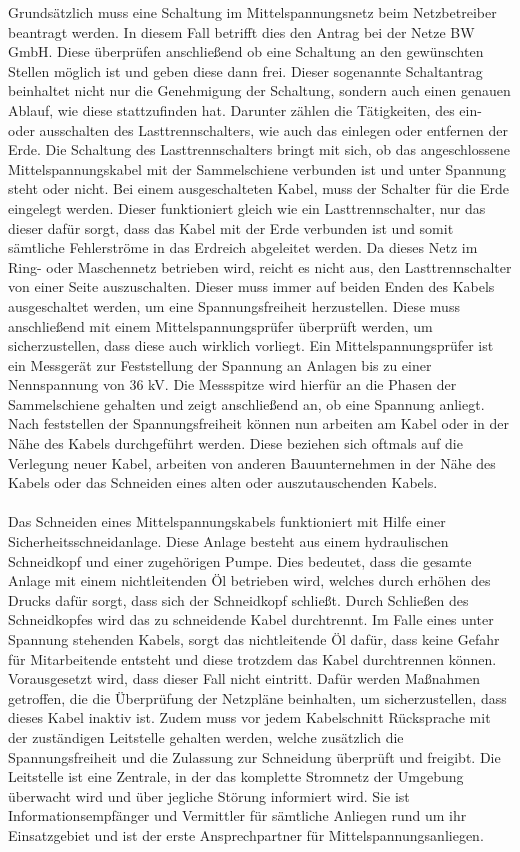 Grundsätzlich muss eine Schaltung im Mittelspannungsnetz beim Netzbetreiber beantragt werden. In diesem Fall betrifft dies den Antrag bei der Netze BW GmbH.
Diese überprüfen anschließend ob eine Schaltung an den gewünschten Stellen möglich ist und geben diese dann frei. Dieser sogenannte Schaltantrag beinhaltet
nicht nur die Genehmigung der Schaltung, sondern auch einen genauen Ablauf, wie diese stattzufinden hat. Darunter zählen die Tätigkeiten, des ein- oder 
ausschalten des Lasttrennschalters, wie auch das einlegen oder entfernen der Erde. Die Schaltung des Lasttrennschalters bringt mit sich, ob das 
angeschlossene Mittelspannungskabel mit der Sammelschiene verbunden ist und unter Spannung steht oder nicht. Bei einem ausgeschalteten Kabel, muss der
Schalter für die Erde eingelegt werden. Dieser funktioniert gleich wie ein Lasttrennschalter, nur das dieser dafür sorgt, dass das Kabel mit der Erde
verbunden ist und somit sämtliche Fehlerströme in das Erdreich abgeleitet werden. Da dieses Netz im Ring- oder Maschennetz betrieben wird, reicht es 
nicht aus, den Lasttrennschalter von einer Seite auszuschalten. Dieser muss immer auf beiden Enden des Kabels ausgeschaltet werden, um eine 
Spannungsfreiheit herzustellen. Diese muss anschließend mit einem Mittelspannungsprüfer überprüft werden, um sicherzustellen, dass diese auch wirklich 
vorliegt. Ein Mittelspannungsprüfer ist ein Messgerät zur Feststellung der Spannung an Anlagen bis zu einer Nennspannung von 36 kV. Die Messspitze wird 
hierfür an die Phasen der Sammelschiene gehalten und zeigt anschließend an, ob eine Spannung anliegt. %
Nach feststellen der 
Spannungsfreiheit können nun arbeiten am Kabel oder in der Nähe des Kabels durchgeführt werden. Diese beziehen sich oftmals auf die Verlegung neuer
Kabel, arbeiten von anderen Bauunternehmen in der Nähe des Kabels oder das Schneiden eines alten oder auszutauschenden Kabels.\\\\
Das Schneiden eines Mittelspannungskabels funktioniert mit Hilfe einer Sicherheitsschneidanlage. Diese Anlage besteht aus einem hydraulischen Schneidkopf
und einer zugehörigen Pumpe. Dies bedeutet, dass die gesamte Anlage mit einem nichtleitenden Öl betrieben wird, welches durch erhöhen des Drucks dafür 
sorgt, dass sich der Schneidkopf schließt. Durch Schließen des Schneidkopfes wird das zu schneidende Kabel durchtrennt. %
Im Falle 
eines unter Spannung stehenden Kabels, sorgt das nichtleitende Öl dafür, dass keine Gefahr für Mitarbeitende entsteht und diese trotzdem das Kabel 
durchtrennen können. Vorausgesetzt wird, dass dieser Fall nicht eintritt. Dafür werden Maßnahmen getroffen, die die Überprüfung der Netzpläne beinhalten,
um sicherzustellen, dass dieses Kabel inaktiv ist. Zudem muss vor jedem Kabelschnitt Rücksprache mit der zuständigen Leitstelle gehalten werden, welche 
zusätzlich die Spannungsfreiheit und die Zulassung zur Schneidung überprüft und freigibt. Die Leitstelle ist eine Zentrale, in der das komplette Stromnetz
der Umgebung überwacht wird und über jegliche Störung informiert wird. Sie ist Informationsempfänger und Vermittler für sämtliche Anliegen rund um ihr 
Einsatzgebiet und ist der erste Ansprechpartner für Mittelspannungsanliegen. 

